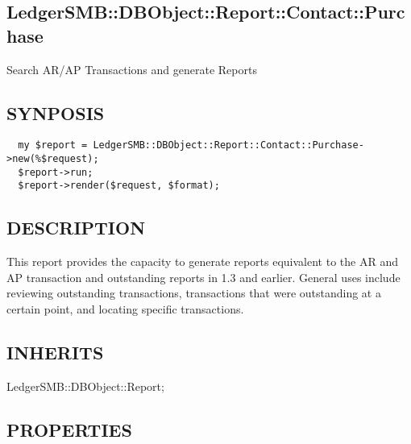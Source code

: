 \begin{description}
\begin{description}
\begin{description}
\begin{description}
\begin{description}
\begin{description}
\begin{description}
\begin{description}
\begin{description}
\begin{description}
\section{LedgerSMB::DBObject::Report::Contact::Purchase\label{LedgerSMB::DBObject::Report::Contact::Purchase}}


Search AR/AP Transactions and
generate Reports

\subsection*{SYNPOSIS\label{LedgerSMB::DBObject::Report::Contact::Purchase_SYNPOSIS}}
\begin{verbatim}
  my $report = LedgerSMB::DBObject::Report::Contact::Purchase->new(%$request);
  $report->run;
  $report->render($request, $format);
\end{verbatim}
\subsection*{DESCRIPTION\label{LedgerSMB::DBObject::Report::Contact::Purchase_DESCRIPTION}}


This report provides the capacity to generate reports equivalent to the AR and
AP transaction and outstanding reports in 1.3 and earlier.  General uses include
reviewing outstanding transactions, transactions that were outstanding at a
certain point, and locating specific transactions.

\subsection*{INHERITS\label{LedgerSMB::DBObject::Report::Contact::Purchase_INHERITS}}
\begin{description}

\item[{LedgerSMB::DBObject::Report;}] \mbox{}\end{description}
\subsection*{PROPERTIES\label{LedgerSMB::DBObject::Report::Contact::Purchase_PROPERTIES}}
\begin{description}


\end{description}
\end{description}
\end{description}
\end{description}
\end{description}
\end{description}
\end{description}
\end{description}
\end{description}
\end{description}
\end{description}
